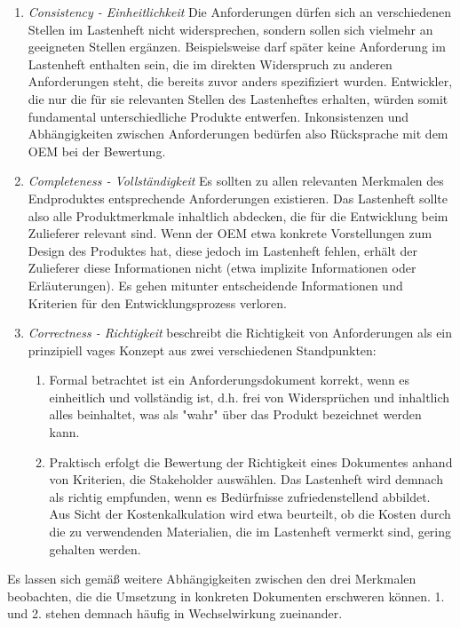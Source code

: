 \documentclass[12pt]{report}
\begin{document}
\begin{enumerate}
\item \textit{Consistency - Einheitlichkeit} Die Anforderungen dürfen sich an verschiedenen Stellen im Lastenheft nicht widersprechen, sondern sollen sich vielmehr an geeigneten Stellen ergänzen. Beispielsweise darf später keine Anforderung im Lastenheft enthalten sein, die im direkten Widerspruch zu anderen Anforderungen steht, die bereits zuvor anders spezifiziert wurden. Entwickler, die nur die für sie relevanten Stellen des Lastenheftes erhalten, würden somit fundamental unterschiedliche Produkte entwerfen. Inkonsistenzen und Abhängigkeiten zwischen Anforderungen bedürfen also Rücksprache mit dem OEM bei der Bewertung.
\item \textit{Completeness - Vollständigkeit} Es sollten zu allen relevanten Merkmalen des Endproduktes entsprechende Anforderungen existieren. Das Lastenheft sollte also alle Produktmerkmale inhaltlich abdecken, die für die Entwicklung beim Zulieferer relevant sind. Wenn der OEM etwa konkrete Vorstellungen zum Design des Produktes hat, diese jedoch im Lastenheft fehlen, erhält der Zulieferer diese Informationen nicht (etwa implizite Informationen oder Erläuterungen). Es gehen mitunter entscheidende Informationen und Kriterien für den Entwicklungsprozess verloren.
\item \textit{Correctness - Richtigkeit} \cite{zg02} beschreibt die Richtigkeit von Anforderungen als ein prinzipiell vages Konzept aus zwei verschiedenen Standpunkten:
\begin{enumerate}
\item Formal betrachtet ist ein Anforderungsdokument korrekt, wenn es einheitlich und vollständig ist, d.h. frei von Widersprüchen und inhaltlich alles beinhaltet, was als "wahr" über das Produkt bezeichnet werden kann.
\item Praktisch erfolgt die Bewertung der Richtigkeit eines Dokumentes anhand von Kriterien, die Stakeholder auswählen. Das Lastenheft wird demnach als richtig empfunden, wenn es Bedürfnisse zufriedenstellend abbildet. Aus Sicht der Kostenkalkulation wird etwa beurteilt, ob die Kosten durch die zu verwendenden Materialien, die im Lastenheft vermerkt sind, gering gehalten werden.
\end{enumerate}
\end{enumerate}

Es lassen sich gemäß \cite{zg02} weitere Abhängigkeiten zwischen den drei Merkmalen beobachten, die die Umsetzung in konkreten Dokumenten erschweren können. 1. und 2. stehen demnach häufig in Wechselwirkung zueinander. 
\end{document}
